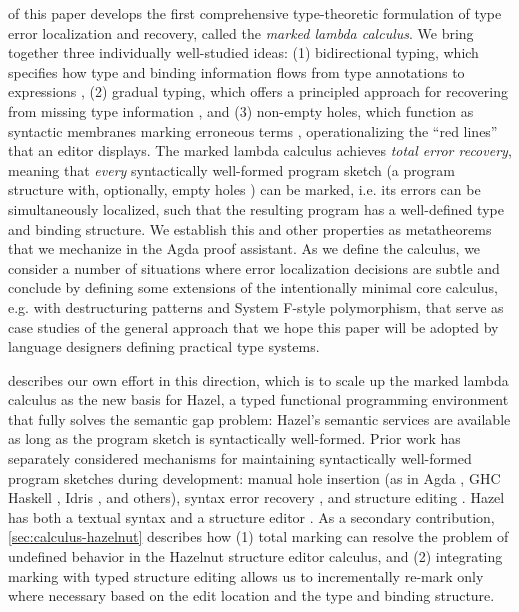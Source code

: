  of this paper develops the first comprehensive {type-theoretic formulation} of type error localization and recovery, called the \emph{marked lambda calculus}.
We bring together three individually well-studied ideas: (1) bidirectional typing, which specifies how type and binding information flows from 
type annotations to expressions \cite{Localinf,BidirTyping}, (2) gradual typing, which offers a principled approach for recovering from missing type information \cite{Siek06a,siek2015refined}, and 
(3) non-empty holes, which function as syntactic membranes marking erroneous terms \cite{HazelnutPOPL}, operationalizing the ``red lines'' that an editor displays.
The marked lambda calculus achieves \emph{total error recovery}, meaning that \emph{every} syntactically well-formed program sketch (a program structure with, optionally, empty holes \cite{solar2013program}) can be marked, i.e. its errors can be simultaneously localized, such that the resulting program has a well-defined type and binding structure.
We establish this and other properties as metatheorems that we mechanize in the Agda proof assistant. 
As we define the calculus, we consider a number of situations where error localization decisions are subtle and conclude by defining some extensions of the intentionally minimal core calculus, e.g. with destructuring patterns and System F-style polymorphism, 
that serve as case studies of the general approach that we hope this paper will be adopted by language designers defining practical type systems.

 describes our own effort in this direction, which is to scale up the marked lambda calculus as the new basis for Hazel, a typed functional programming environment that fully solves the semantic gap problem: Hazel's semantic services are available as long as the program sketch is syntactically well-formed. Prior work has separately considered mechanisms for maintaining syntactically well-formed program sketches during development: manual hole insertion (as in Agda \cite{norell:thesis}, GHC Haskell \cite{haskell-holes}, Idris \cite{DBLP:journals/jfp/Brady13}, and others), syntax error recovery \cite{medeiros20,sorkin11}, and structure editing \cite{HazelnutPOPL,teitelbaum_cornell_1981}. 
Hazel has both a textual syntax and a structure editor \cite{HazelnutPOPL,DBLP:conf/vl/Moon023}. 
As a secondary contribution, 
\cref{sec:calculus-hazelnut} describes how (1)  total marking can resolve the problem of undefined behavior in the Hazelnut structure editor calculus, 
and (2) integrating marking with typed structure editing allows us to incrementally re-mark only where necessary based on the edit location and the type and binding structure.

